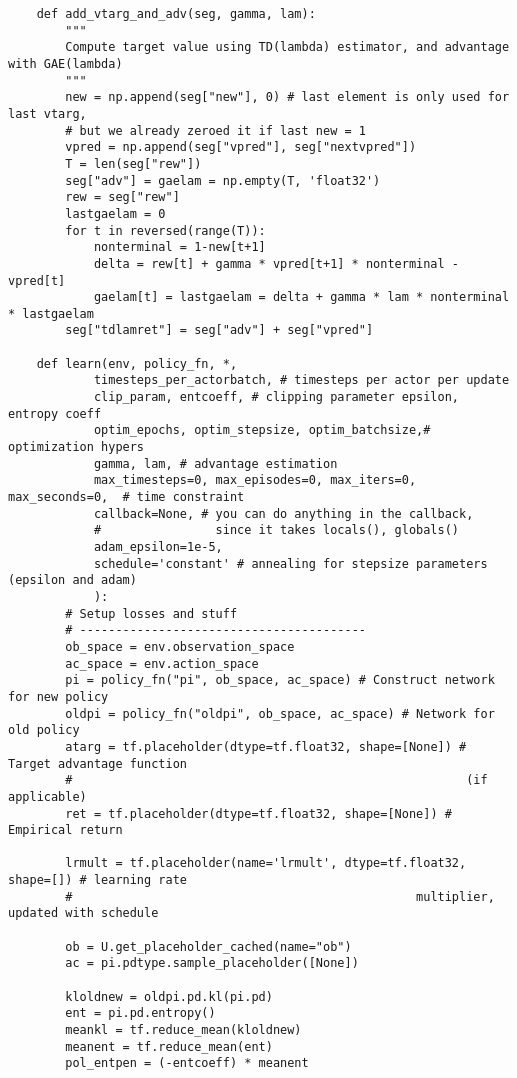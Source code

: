 \begin{verbatim}
    def add_vtarg_and_adv(seg, gamma, lam):
        """
        Compute target value using TD(lambda) estimator, and advantage with GAE(lambda)
        """
        new = np.append(seg["new"], 0) # last element is only used for last vtarg, 
        # but we already zeroed it if last new = 1
        vpred = np.append(seg["vpred"], seg["nextvpred"])
        T = len(seg["rew"])
        seg["adv"] = gaelam = np.empty(T, 'float32')
        rew = seg["rew"]
        lastgaelam = 0
        for t in reversed(range(T)):
            nonterminal = 1-new[t+1]
            delta = rew[t] + gamma * vpred[t+1] * nonterminal - vpred[t]
            gaelam[t] = lastgaelam = delta + gamma * lam * nonterminal * lastgaelam
        seg["tdlamret"] = seg["adv"] + seg["vpred"]

    def learn(env, policy_fn, *,
            timesteps_per_actorbatch, # timesteps per actor per update
            clip_param, entcoeff, # clipping parameter epsilon, entropy coeff
            optim_epochs, optim_stepsize, optim_batchsize,# optimization hypers
            gamma, lam, # advantage estimation
            max_timesteps=0, max_episodes=0, max_iters=0, max_seconds=0,  # time constraint
            callback=None, # you can do anything in the callback, 
            #                since it takes locals(), globals()
            adam_epsilon=1e-5,
            schedule='constant' # annealing for stepsize parameters (epsilon and adam)
            ):
        # Setup losses and stuff
        # ----------------------------------------
        ob_space = env.observation_space
        ac_space = env.action_space
        pi = policy_fn("pi", ob_space, ac_space) # Construct network for new policy
        oldpi = policy_fn("oldpi", ob_space, ac_space) # Network for old policy
        atarg = tf.placeholder(dtype=tf.float32, shape=[None]) # Target advantage function 
        #                                                       (if applicable)
        ret = tf.placeholder(dtype=tf.float32, shape=[None]) # Empirical return

        lrmult = tf.placeholder(name='lrmult', dtype=tf.float32, shape=[]) # learning rate 
        #                                                multiplier, updated with schedule

        ob = U.get_placeholder_cached(name="ob")
        ac = pi.pdtype.sample_placeholder([None])

        kloldnew = oldpi.pd.kl(pi.pd)
        ent = pi.pd.entropy()
        meankl = tf.reduce_mean(kloldnew)
        meanent = tf.reduce_mean(ent)
        pol_entpen = (-entcoeff) * meanent


\end{verbatim}

